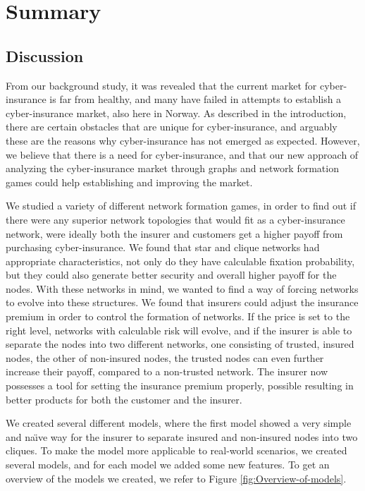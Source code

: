 \chapter{Summary}
\section{Discussion}
From our background study, it was revealed that the current market for cyber-insurance is far from healthy, and many have failed in attempts to establish a cyber-insurance market, also here in Norway. 
As described in the introduction, there are certain obstacles that are unique for cyber-insurance, and arguably these are the reasons why cyber-insurance has not emerged as expected. 
 However, we believe that there is a need for cyber-insurance, and that our new approach of analyzing the cyber-insurance market through graphs and network formation games could help establishing and improving the market.

We studied a variety of different network formation games, in order to find out if there were any superior network topologies that would fit as a cyber-insurance network, were ideally both the insurer and customers get a higher payoff from purchasing cyber-insurance. 
We found that star and clique networks had appropriate characteristics, not only do they have calculable fixation probability, but they could also generate better security and overall higher payoff for the nodes. With these networks in mind, we wanted to find a way of forcing networks to evolve into these structures.  We found that insurers could adjust the insurance premium in order to control the formation of networks. If the price is set to the right level, networks with calculable risk will evolve, and if the insurer is able to separate the nodes into two different networks, one consisting of trusted, insured nodes, the other of non-insured nodes, the trusted nodes can even further increase their payoff, compared to a non-trusted network. The insurer now possesses a tool for setting the insurance premium properly, possible resulting in better products for both the customer and the insurer.


We created several different models, where the first model showed a very simple and na\"{\i}ve way for the insurer to separate insured and non-insured nodes into two cliques. To make the model more applicable to real-world scenarios, we created several models, and for each model we added some new features. To get an overview of the models we created, we refer to Figure \ref{fig:Overview-of-models}.

